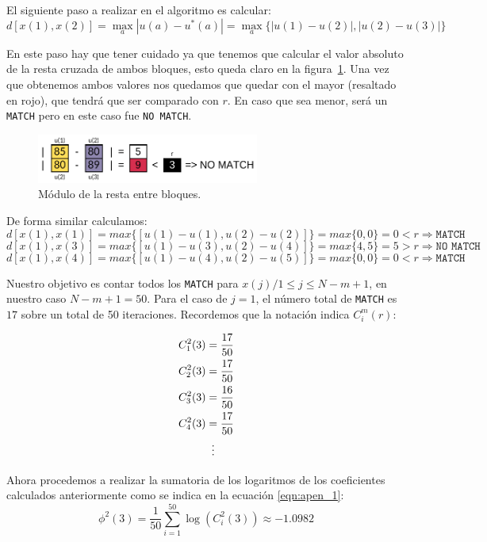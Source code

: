 \documentclass[a4paper,12pt]{article}
\begin{document}
El siguiente paso a realizar en el algoritmo es calcular:
$$d[x(1),x(2)]=\max_a |u(a)-u^*(a)|=\max_a\{|u(1)-u(2)|,|u(2)-u(3)|\}$$

En este paso hay que tener cuidado ya que tenemos que calcular el valor absoluto de la resta cruzada de ambos bloques, esto queda claro en la figura~\ref{fig:apen_3}. Una vez que obtenemos ambos valores nos quedamos que quedar con el mayor (resaltado en rojo), que tendrá que ser comparado con $r$. En caso que sea menor, será un \texttt{MATCH} pero en este caso fue \texttt{NO MATCH}.

\begin{figure}[H]
	\begin{center}
	\includegraphics[width=0.65\textwidth]{apen_3.png}
  	\caption{Módulo de la resta entre bloques.}
  	\label{fig:apen_3}
  	\end{center}
\end{figure}

De forma similar calculamos:
$$d[x(1),x(1)] = max \{[u(1)-u(1),u(2)-u(2)]\} = max\{0,0\}=0<r \Rightarrow \texttt{MATCH}$$
$$d[x(1),x(3)] = max \{[u(1)-u(3),u(2)-u(4)]\} = max\{4,5\}=5>r \Rightarrow \texttt{NO MATCH}$$
$$d[x(1),x(4)] = max \{[u(1)-u(4),u(2)-u(5)]\} = max\{0,0\}=0<r \Rightarrow \texttt{MATCH}$$

Nuestro objetivo es contar todos los \texttt{MATCH} para $x(j)/1 \leq j \leq N-m+1$, en nuestro caso $N-m+1=50$.
Para el caso de $j=1$, el número total de \texttt{MATCH} es $17$ sobre un total de 50 iteraciones.
Recordemos que la notación indica $C_i^m(r)$:

\begin{align*}
   C_1^2(3)&=\frac{17}{50} 	\\
   C_2^2(3)&=\frac{17}{50} 	\\
   C_3^2(3)&=\frac{16}{50} 	\\
   C_4^2(3)&=\frac{17}{50} 	\\
   & \vdotswithin{=} 		\\
\end{align*}

Ahora procedemos a realizar la sumatoria de los logaritmos de los coeficientes calculados anteriormente como se indica en la ecuación \ref{eqn:apen_1}:
$$\phi^2(3)=\frac{1}{50} \sum_{i=1}^{50} \log(C_i^2(3)) \approx -1.0982$$
\end{document}
